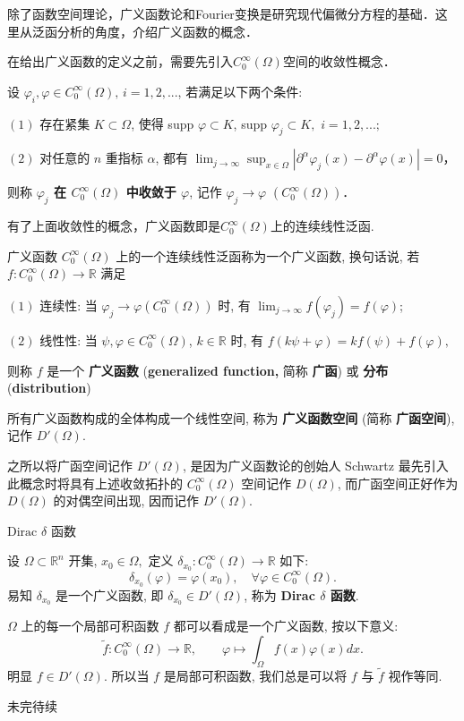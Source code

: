 
除了函数空间理论，广义函数论和Fourier变换是研究现代偏微分方程的基础．这里从泛函分析的角度，介绍广义函数的概念．

在给出广义函数的定义之前，需要先引入$C_0^\infty(\Omega)$空间的收敛性概念．

\begin{definition}{}
设 $\varphi_i,\varphi\in C_0^\infty(\Omega),\,i=1,2,...$,  若满足以下两个条件:

$(1)$ 存在紧集 $K\subset\Omega$, 使得 supp $\varphi\subset K$, supp $\varphi_{j}\subset K,$
$i=1,2,...;$ 

$(2)$ 对任意的 $n$ 重指标 $\alpha$, 都有 ${\displaystyle \lim_{j\rightarrow\infty}{\displaystyle \sup_{x\in\Omega}\left|\partial^{\alpha}\varphi_{j}(x)-\partial^{\alpha}\varphi(x)\right|=0}}$，


则称\textbf{ \textbf{$\varphi_{j}$ 在 $C_{0}^{\infty}(\Omega)$ 中收敛于 $\varphi$}}, 记作 
$\varphi_{j}\rightarrow\varphi$ $(C_{0}^{\infty}(\Omega))$．

\end{definition}

有了上面收敛性的概念，广义函数即是$C_0^\infty(\Omega)$上的连续线性泛函.

\begin{definition}{广义函数}
$C_{0}^{\infty}(\Omega)$ 上的一个连续线性泛函称为一个广义函数, 换句话说, 若 $f:C_{0}^{\infty}(\Omega)\rightarrow\mathbb{R}$
满足

$(1)$ 连续性: 当 $\varphi_{j}\rightarrow\varphi(C_{0}^{\infty}(\Omega))$
时, 有 ${\displaystyle \lim_{j\rightarrow\infty}f(\varphi_{j})=f(\varphi)}$; 

$(2)$ 线性性: 当 $\psi,\varphi\in C_{0}^{\infty}(\Omega)$, $k\in\mathbb{R}$
时, 有 $f(k\psi+\varphi)=kf(\psi)+f(\varphi),$

则称 $f$ 是一个 \textbf{广义函数} (\textbf{generalized function,} 简称 \textbf{广函}) 或 \textbf{分布} (\textbf{distribution})

所有广义函数构成的全体构成一个线性空间, 称为 \textbf{广义函数空间} (简称 \textbf{广函空间}), 记作 $D'(\Omega)$. 

\end{definition}

之所以将广函空间记作 $D'(\Omega)$, 是因为广义函数论的创始人 Schwartz 最先引入此概念时将具有上述收敛拓扑的
$C_{0}^{\infty}(\Omega)$ 空间记作 $D(\Omega)$, 而广函空间正好作为 $D(\Omega)$
的对偶空间出现, 因而记作 $D'(\Omega)$. 
\begin{example}{$\mathrm{Dirac}$ $\delta$ 函数
}

设 $\Omega\subset\mathbb{R}^{n}$ 开集, $x_{0}\in\Omega,$ 定义 $\delta_{x_{0}}:C_{0}^{\infty}(\Omega)\rightarrow\mathbb{R}$
如下: 
\[
\delta_{x_{0}}(\varphi)=\varphi(x_{0}),\quad\forall\varphi\in C_{0}^{\infty}(\Omega).
\]
易知 $\delta_{x_{0}}$ 是一个广义函数, 即 $\delta_{x_{0}}\in D'(\Omega)$, 称为
\textbf{Dirac $\delta$ 函数}. 
\end{example}

\begin{example}{}
$\Omega$ 上的每一个局部可积函数 $f$ 都可以看成是一个广义函数, 按以下意义: 
\[
\tilde{f}:C_{0}^{\infty}(\Omega)\rightarrow\mathbb{R},\quad\quad\varphi\mapsto{\displaystyle \int_{\Omega}f(x)\varphi(x)dx}.
\]
明显 $f\in D'(\Omega)$. 所以当 $f$ 是局部可积函数, 我们总是可以将 $f$ 与 $\tilde{f}$
视作等同. 
\end{example}

未完待续